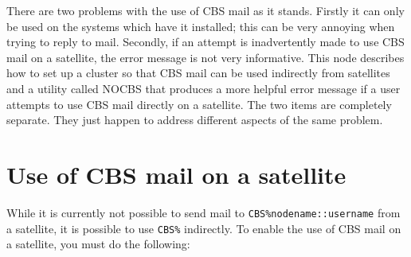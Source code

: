 There are two problems with the use of CBS mail as it stands. Firstly it can
only be used on the systems which have it installed; this can be very annoying
when trying to reply to mail. Secondly, if an attempt is inadvertently made to
use CBS mail on a satellite, the error message is not very informative. This
node describes how to set up a cluster so that CBS mail can be used indirectly
from satellites and a utility called NOCBS that produces a more helpful error
message if a user attempts to use CBS mail directly on a satellite. The two
items are completely separate. They just happen to address different aspects of
the same problem.

\section{Use of CBS mail on a satellite}
\label{cbs}

While it is currently not possible to send mail to {\tt CBS\%nodename::username}
from a satellite, it is possible to use {\tt CBS\%} indirectly. To enable the
use of CBS mail on a satellite, you must do the following:

